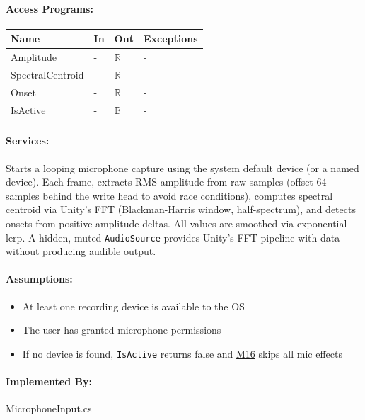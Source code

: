 \documentclass[12pt, titlepage]{article}
\begin{document}
\paragraph{Access Programs:}

\begin{center}
\begin{tabular}{p{35mm}p{2cm}p{2cm}p{30mm}}
\toprule
\textbf{Name} & \textbf{In} & \textbf{Out} & \textbf{Exceptions} \\
\midrule
Amplitude & - & $\mathbb{R}$ & - \\
SpectralCentroid & - & $\mathbb{R}$ & - \\
Onset & - & $\mathbb{R}$ & - \\
IsActive & - & $\mathbb{B}$ & - \\
\bottomrule
\end{tabular}
\end{center}

\paragraph{Services:}
Starts a looping microphone capture using the system default device (or a named device).
Each frame, extracts RMS amplitude from raw samples (offset 64 samples behind the write
head to avoid race conditions), computes spectral centroid via Unity's FFT
(Blackman-Harris window, half-spectrum), and detects onsets from positive amplitude deltas.
All values are smoothed via exponential lerp. A hidden, muted \texttt{AudioSource} provides
Unity's FFT pipeline with data without producing audible output.

\paragraph{Assumptions:}
\begin{itemize}
\item At least one recording device is available to the OS
\item The user has granted microphone permissions
\item If no device is found, \texttt{IsActive} returns false and \hyperref[M16]{M16} skips all mic effects
\end{itemize}

\paragraph{Implemented By:}
MicrophoneInput.cs
\end{document}
